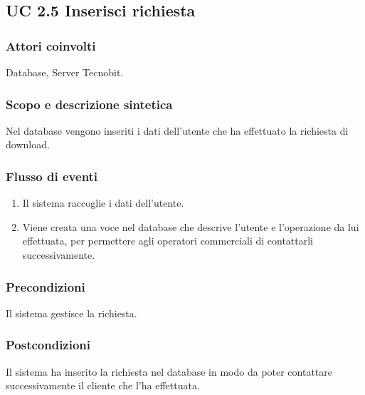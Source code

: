 \subsection*{UC 2.5 Inserisci richiesta}
\subsubsection*{Attori coinvolti}  
Database, Server Tecnobit. 
\subsubsection*{Scopo e descrizione sintetica}
Nel database vengono inseriti i dati dell'utente che ha effettuato la richiesta di download. 
\subsubsection*{Flusso di eventi}
\begin{enumerate}
\item Il sistema raccoglie i dati dell'utente.
\item Viene creata una voce nel database che descrive l'utente e l'operazione da lui effettuata, per permettere agli 
operatori commerciali di contattarli successivamente.
\end{enumerate}
\subsubsection*{Precondizioni} Il sistema gestisce la richiesta.
\subsubsection*{Postcondizioni} Il sistema ha inserito la richiesta nel database in modo da poter contattare successivamente il cliente che l'ha effettuata.

